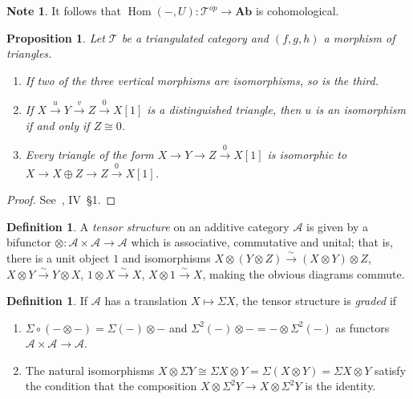 \documentclass[12pt,a4paper]{article}
\newtheorem{proposition}[theorem]{Proposition}
\theoremstyle{definition}
\newtheorem{definition}[theorem]{Definition}
\newtheorem{note}[theorem]{Note}
\newcommand{\Ab}{\mathbf{Ab}}
\newcommand{\Hom}{\operatorname{Hom}}
\begin{document}
\begin{note}
It follows that $\Hom(-,U):\mathcal{T}^{op}\to\Ab$ is cohomological.
\end{note}

\begin{proposition}\label{prop:TC-properties}
Let $\mathcal{T}$ be a triangulated category and $(f,g,h)$ a morphism of triangles.
\begin{enumerate}
  \item If two of the three vertical morphisms are isomorphisms, so is the third.
  \item If $X\xrightarrow{u} Y\xrightarrow{v} Z\xrightarrow{0} X[1]$ is a
    distinguished triangle, then $u$ is an isomorphism if and only if $Z\cong 0$.
  \item Every triangle of the form $X\to Y\to Z\xrightarrow{0} X[1]$ is isomorphic
    to $X\to X\oplus Z\to Z\xrightarrow{0} X[1]$.
\end{enumerate}
\end{proposition}
\begin{proof}
See~\cite{BBD}, IV~\S1.
\end{proof}

\begin{definition}\label{def:tensor-structure}
A \emph{tensor structure} on an additive category $\mathcal{A}$ is given by a
bifunctor $\otimes:\mathcal{A}\times\mathcal{A}\to\mathcal{A}$ which is associative,
commutative and unital; that is, there is a unit object $1$ and isomorphisms
$X\otimes(Y\otimes Z)\xrightarrow{\sim}(X\otimes Y)\otimes Z$,
$X\otimes Y\xrightarrow{\sim} Y\otimes X$, $1\otimes X\xrightarrow{\sim} X$,
$X\otimes 1\xrightarrow{\sim} X$, making the obvious diagrams commute.
\end{definition}

\begin{definition}\label{def:graded-tensor}
If $\mathcal{A}$ has a translation $X\mapsto\Sigma X$, the tensor structure is
\emph{graded} if
\begin{enumerate}
  \item $\Sigma\circ(-\otimes-) = \Sigma(-)\otimes-$ and
    $\Sigma^2(-)\otimes-= -\otimes\Sigma^2(-)$ as functors
    $\mathcal{A}\times\mathcal{A}\to\mathcal{A}$.
  \item The natural isomorphisms
    $X\otimes\Sigma Y\cong\Sigma X\otimes Y=\Sigma(X\otimes Y)=\Sigma X\otimes Y$
    satisfy the condition that the composition
    $X\otimes\Sigma^2 Y\to X\otimes\Sigma^2 Y$ is the identity.
\end{enumerate}
\end{definition}
\end{document}
